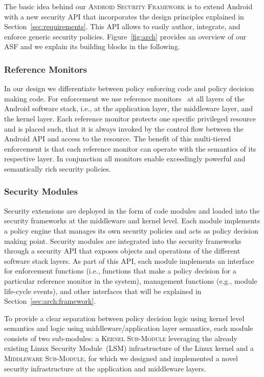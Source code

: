\documentclass[letterpaper,twocolumn,10pt]{article}
\newcommand{\OURNAME}{\textsc{Android Security Framework}\xspace}
\newcommand{\OURSHORT}{\textsc{ASF}\xspace}
\newcommand{\KMODULE}{\textsc{Kernel Sub-Module}\xspace}
\newcommand{\MMODULE}{\textsc{Middleware Sub-Module}\xspace}
\begin{document}
The basic idea behind our \OURNAME is to extend Android with a new security API that incorporates the design principles explained in Section~\ref{sec:requirements}. This API allows to easily author, integrate, and enforce generic security policies. Figure~\ref{fig:arch} provides an overview of our \OURSHORT and we explain its building blocks in the following.


\subsubsection{Reference Monitors}
In our design we differentiate between policy enforcing code and policy decision making code. For enforcement we use reference monitors~\cite{Lampson:1974:PRO:775265.775268,orangebook} at all layers of the Android software stack, i.e., at the application layer, the middleware layer, and the kernel layer. Each reference monitor protects one specific privileged resource and is placed such, that it is always invoked by the control flow between the Android API and access to the resource. The benefit of this multi-tiered enforcement is that each reference monitor can operate with the semantics of its respective layer. In conjunction all monitors enable exceedingly powerful and semantically rich security policies.

\subsubsection{Security Modules}
Security extensions are deployed in the form of code modules and loaded into the security frameworks at the middleware and kernel level. Each module implements a policy engine that manages its own security policies and acts as policy decision making point. Security modules are integrated into the security frameworks through a security API that exposes objects and operations of the different software stack layers. As part of this API, each module implements an interface for enforcement functions (i.e., functions that make a policy decision for a particular reference monitor in the system), management functions (e.g., module life-cycle events), and other interfaces that will be explained in Section~\ref{sec:arch:framework}.

To provide a clear separation between policy decision logic using kernel level semantics and logic using middleware/application layer semantics, each module consists of two sub-modules: a \KMODULE leveraging the already existing Linux Security Module~(LSM) infrastructure of the Linux kernel and a \MMODULE, for which we designed and implemented a novel security infrastructure at the application and middleware layers.
\end{document}
